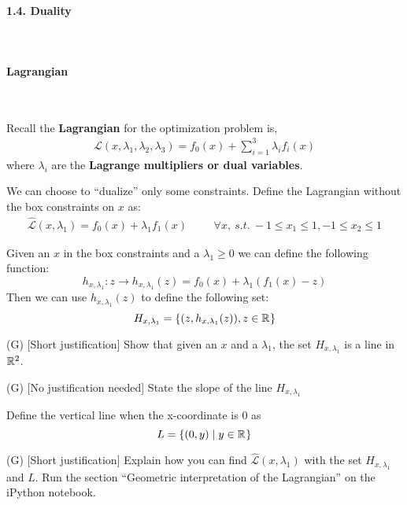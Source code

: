 \paragraph{1.4. Duality}\ 

\paragraph{Lagrangian}\ 

Recall the \textbf{Lagrangian} for the optimization problem is,
\begin{align*}
    \mathcal{L}(x,\lambda_1, \lambda_2, \lambda_3) = f_0(x) + \sum_{i=1}^{3}\lambda_i f_i(x)
\end{align*}
where $\lambda_i$ are the \textbf{Lagrange multipliers or dual variables}.

We can choose to ``dualize'' only some constraints. 
Define the Lagrangian without the box constraints on $x$ as:
\begin{align*}
    \hat{\mathcal{L}}(x,\lambda_1) = f_0(x) + \lambda_1 f_1(x) &&& \forall x,\ s.t.\  -1 \leq x_1 \leq 1, -1 \leq x_2 \leq 1
\end{align*}

Given an $x$ in the box constraints and a $\lambda_1 \geq 0$ we can define the following function:
\[h_{x,\lambda_1}:z\to h_{x,\lambda_1}(z) = f_0(x) + \lambda_1 (f_1(x)-z)\]
Then we can use $h_{x,\lambda_1}(z)$ to define the following set:
\[H_{x,\lambda_1} = \{(z, h_{x,\lambda_1}(z)), z\in\mathbb{R}^{}\}\]
\begin{enumerate}
    \qitem (G) [Short justification] Show that given an $x$ and a $\lambda_1$, the set $H_{x,\lambda_1}$ is a line in $\mathbb{R}^{2}$.
    
    \sol{}
    
    \qitem (G) [No justification needed] State the slope of the line $H_{x,\lambda_1}$
    
    \sol{}
\end{enumerate}

Define the vertical line when the x-coordinate is 0 as 
\[L=\{(0,y) \mid y\in\mathbb{R}^{}\}\]
\begin{enumerate}
    \setcounter{enumi}{2}
    \qitem (G) [Short justification] Explain how you can find $\hat{\mathcal{L}}(x,\lambda_1)$ with the set $H_{x,\lambda_1}$ and $L$. Run the section ``Geometric interpretation of the Lagrangian'' on the iPython notebook.
    
    \sol{}
\end{enumerate}

